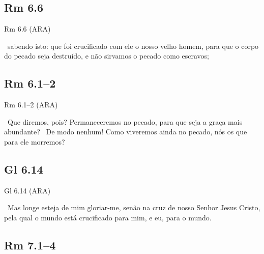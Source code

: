 \documentclass[12pt,aspectratio=169]{beamer}
\newcommand{\ver}[1]{%
    \raisebox{0.50ex}{%
        \scalebox{1.1}{%
            \pmb{\textbf{\textcolor{BSpbg}{#1}}}%
        }%
    }%
}
\newcommand{\QUOTE}[1]{%
    \par\noindent\hspace*{0.05\linewidth}%
    \begin{minipage}{0.9\linewidth}%
        \linespread{1.35}\large{#1}%
    \end{minipage}%
}
\begin{document}
    \subsection{Rm 6.6}

    \begin{frame}{Rm 6.6 (ARA)}
        \QUOTE{%
            \ver{6}~sabendo isto: que foi crucificado com ele o nosso velho homem, para que o
            corpo do pecado seja destruído, e não sirvamos o pecado como escravos;
        }
    \end{frame}

    \subsection{Rm 6.1--2}

    \begin{frame}{Rm 6.1--2 (ARA)}
        \QUOTE{%
            \ver{1}~Que diremos, pois? Permaneceremos no pecado, para que seja a graça mais
            abundante?
            \ver{2}~De modo nenhum! Como viveremos ainda no pecado, nós os que para ele
            morremos?
        }
    \end{frame}

    \subsection{Gl 6.14}

    \begin{frame}{Gl 6.14 (ARA)}
        \QUOTE{%
            \ver{14}~Mas longe esteja de mim gloriar-me, senão na cruz de nosso Senhor Jesus
            Cristo, pela qual o mundo está crucificado para mim, e eu, para o mundo.
        }
    \end{frame}

    \subsection{Rm 7.1--4}
\end{document}
